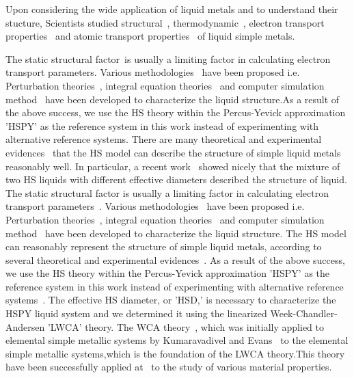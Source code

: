 \documentclass[final,12pt]{elsarticle}
\begin{document}
Upon considering the wide application of liquid metals and to understand their stucture, Scientists studied structural~\cite{Bhuiyan1996}, thermodynamic~\cite{Bhuiyan2000,Zahid1999}, electron transport properties~\cite{Sharmin2002} and  atomic transport properties~\cite{Bhuiyan2003,Gosh2013,Bhuiyan2008} of liquid simple metals. 

The static structural factor~\cite{Leavens1981,Nardi1996}is usually a limiting factor in calculating electron transport parameters. Various methodologies~\cite{Hansen1976} have been proposed i.e. Perturbation theories~\cite{Week1971,Ishihara1968,Barkar1967}, integral equation theories~\cite{Bhuiyan1993} and computer simulation method~\cite{McGreevey1991} have been developed to characterize the liquid structure.As a result of the above success, we use the HS theory within the Percus-Yevick approximation 'HSPY' as the reference system in this work instead of experimenting with alternative reference systems. There are many theoretical and experimental evidences~\cite{Waseda,Shimoji39} that the HS model can describe the structure of simple liquid metals reasonably well. In particular, a recent work~\cite{Khaleque2002} showed nicely that the mixture of two HS liquids with different effective diameters described the structure of liquid.
The static structural factor is usually a limiting factor in calculating electron transport parameters~\cite{Leavens1981,Nardi1996}. Various methodologies~\cite{Hansen1976} have been proposed i.e. Perturbation theories~\cite{Week1971,Ishihara1968,Barkar1967}, integral equation theories~\cite{Bhuiyan1993} and computer simulation method~\cite{McGreevey1991} have been developed to characterize the liquid structure.  The HS model can reasonably represent the structure of simple liquid metals, according to several theoretical and experimental evidences~\cite{Waseda,Shimoji39}. As a result of the above success, we use the HS theory within the Percus-Yevick approximation 'HSPY' as the reference system in this work instead of experimenting with alternative reference systems~\cite{Ross40,Hafner41}. The effective HS diameter, or 'HSD,' is necessary to characterize the HSPY liquid system and we determined it using the linearized Week-Chandler-Andersen 'LWCA' theory. The WCA theory~\cite{Mayer1980}, which was initially applied to elemental simple metallic systems by Kumaravadivel and Evans~\cite{Kumar23} to the elemental simple metallic systems,which is the foundation of the LWCA theory.This theory have been successfully applied at~\cite{Gosh2007,Bhuiyan2003} to the study of various material properties.
\end{document}

